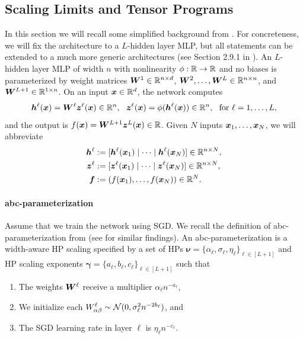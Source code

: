 \documentclass{article} %
\newcommand{\bhp}{\bm{\nu}}                       %
\newcommand{\bhpexp}{\bm{\gamma}}                 %
\renewcommand{\citep}[1]{\cite{#1}}
\begin{document}
\subsection{Scaling Limits and Tensor Programs}\label{app:tensor_programs}
In this section we will recall some simplified background from \citep{yang2021tensor, yang2023tensor}. For concreteness, we will fix the architecture to a $L$-hidden layer MLP, but all statements can be extended to a much more generic architectures (see Section 2.9.1 in \citep{yang2023tensor}). An $L$-hidden layer MLP of width $n$ with nonlinearity $\phi : \mathbb{R} \to \mathbb{R}$ and no biases is parameterized by weight matrices ${\boldsymbol W}^1 \in \mathbb{R}^{n \times d}$, ${\boldsymbol W}^2, \ldots, {\boldsymbol W}^L \in \mathbb{R}^{n \times n}$, and ${\boldsymbol W}^{L+1} \in \mathbb{R}^{1 \times n}$. On an input ${\boldsymbol x} \in \mathbb{R}^d$, the network computes
\begin{equation}\label{eq:mlp}
    {\boldsymbol h}^\ell({\boldsymbol x}) = {\boldsymbol W}^{\ell} {\boldsymbol z}^{\ell}({\boldsymbol x}) \in \mathbb{R}^n,~~{\boldsymbol z}^{\ell}({\boldsymbol x}) = \phi({\boldsymbol h}^{\ell}({\boldsymbol x})) \in \mathbb{R}^n,~~\text{for } \ell = 1, \ldots, L,
\end{equation}
and the output is $f({\boldsymbol x}) = {\boldsymbol W}^{L+1} {\boldsymbol z}^{L}({\boldsymbol x}) \in \mathbb{R}$. Given $N$ inputs ${\boldsymbol x}_1, \ldots, {\boldsymbol x}_N$, we will abbreviate
\begin{align*}
    {\boldsymbol h}^\ell &:= [{\boldsymbol h}^\ell({\boldsymbol x}_1) \mid \cdots \mid {\boldsymbol h}^\ell({\boldsymbol x}_N)] \in \mathbb{R}^{n \times N}, \\
    {\boldsymbol z}^\ell &:= [{\boldsymbol z}^\ell({\boldsymbol x}_1) \mid \cdots \mid {\boldsymbol z}^\ell({\boldsymbol x}_N)] \in \mathbb{R}^{n \times N}, \\
    {\boldsymbol f}   &:= (f({\boldsymbol x}_1), \ldots, f({\boldsymbol x}_N)) \in \mathbb{R}^N.
\end{align*}
\paragraph{abc-parameterization} 
Assume that we train the network using SGD. We recall the definition of abc-parameterization from \citep{yang2021tensor} (see \cite{geiger2020disentangling,chizat2024feature} for similar findings). An abc-parameterization is a width-aware HP scaling specified by a set of HPs $\bhp = \{\alpha_\ell, \sigma_\ell, \eta_\ell\}_{\ell \in [L+1]}$ and HP scaling exponents $\bhpexp = \{a_\ell, b_\ell, c_\ell\}_{\ell \in [L+1]}$ such that
\begin{enumerate}[label=(\alph*)]
    \item The weights ${\boldsymbol W}^{\ell}$ receive a multiplier $\alpha_\ell n^{-a_\ell}$,
    \item We initialize each $W_{\alpha \beta}^\ell \sim {\mathcal N}(0, \sigma^2_\ell n^{-2b_\ell})$, and
    \item The SGD learning rate in layer $\ell$ is $\eta_\ell n^{-c_\ell}$.
\end{enumerate}
\end{document}
